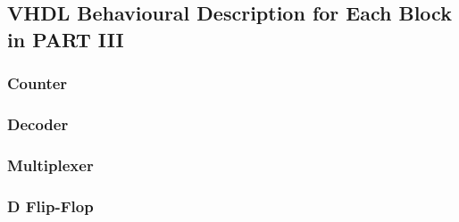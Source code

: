\documentclass[11pt]{article}
\begin{document}
\begin{appendix}

\subsection{VHDL Behavioural Description for Each Block in PART III}
\label{app:c2}

\subsubsection{Counter}



\subsubsection{Decoder}


\subsubsection{Multiplexer}


\subsubsection{D Flip-Flop}



\end{appendix}
\end{document}
